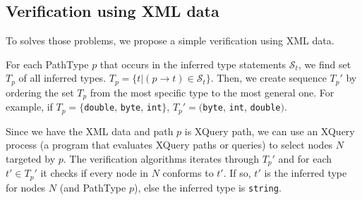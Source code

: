 \subsection{Verification using XML data}
To solves those problems, we propose a simple verification using XML data.

For each PathType $p$ that occurs in the inferred type statements $\mathcal{S}_t$, we find set $T_p$ of all inferred types. $T_p = \{t|(p \rightarrow t) \in \mathcal{S}_t\}$. Then, we create sequence $T_p'$ by ordering the set $T_p$ from the most specific type to the most general one. For example, if $T_p = \{$\texttt{double}, \texttt{byte}, \texttt{int}$\}$, $T_p' = ($\texttt{byte}, \texttt{int}, \texttt{double}$)$.

Since we have the XML data and path $p$ is XQuery path, we can use an XQuery process (a program that evaluates XQuery paths or queries) to select nodes $N$ targeted by $p$. The verification algorithms iterates through $T_p'$ and for each $t' \in T_p'$ it checks if every node in $N$ conforms to $t'$. If so, $t'$ is the inferred type for nodes $N$ (and PathType $p$), else the inferred type is \texttt{string}.
